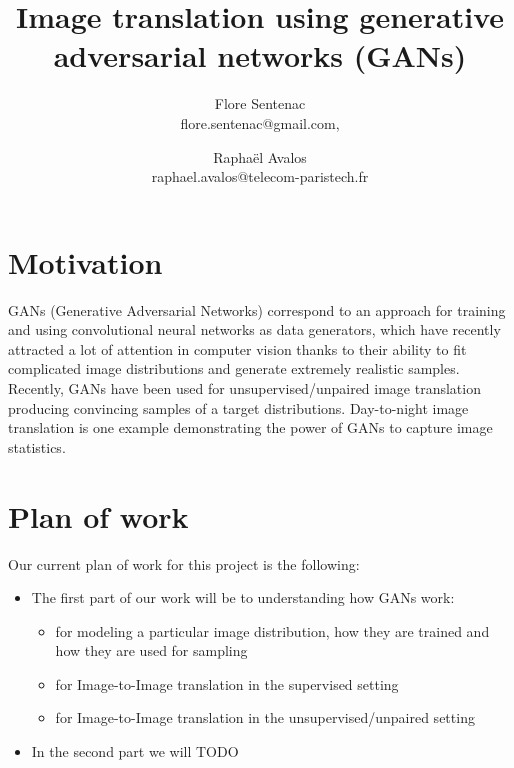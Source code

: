 \documentclass[11pt,a4paper]{article}
\author{Flore Sentenac \\ flore.sentenac@gmail.com, \and Raphaël Avalos \\ raphael.avalos@telecom-paristech.fr}
\title{Image translation using generative adversarial networks (GANs)}
\date{}
\begin{document}
\maketitle
\section*{Motivation}
GANs (Generative Adversarial Networks) correspond to an approach for training and using convolutional neural networks as data generators, which have recently attracted a lot of attention in computer vision thanks to their ability to fit complicated image distributions and generate extremely realistic samples. Recently, GANs have been used for unsupervised/unpaired image translation producing convincing samples of a target distributions. Day-to-night image translation is one example demonstrating the power of GANs to capture image statistics.


\section*{Plan of work}
Our current plan of work for this project is the following:
\begin{itemize}
\item The first part of our work will be to understanding how GANs work:
\begin{itemize}
\item for modeling a particular image distribution, how they are trained and how they are used for sampling
\item for Image-to-Image translation in the supervised setting
\item for Image-to-Image translation in the unsupervised/unpaired setting
\end{itemize}
\item In the second part we will TODO
\end{itemize}
\end{document}
